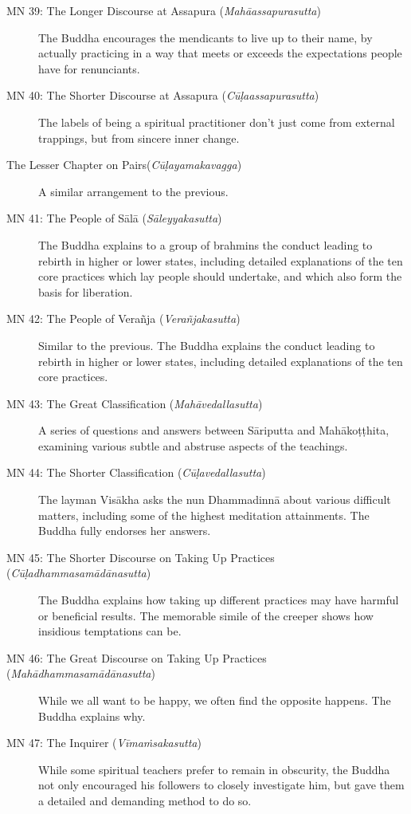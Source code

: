 \documentclass[12pt,openany]{book}%
\begin{document}
\begin{description}
\item[MN 39: The Longer Discourse at Assapura (\textit{\textsanskrit{Mahāassapurasutta}})] The Buddha encourages the mendicants to live up to their name, by actually practicing in a way that meets or exceeds the expectations people have for renunciants.%
\item[MN 40: The Shorter Discourse at Assapura (\textit{\textsanskrit{Cūḷaassapurasutta}})] The labels of being a spiritual practitioner don’t just come from external trappings, but from sincere inner change.%
\item[The Lesser Chapter on Pairs(\textit{\textsanskrit{Cūḷayamakavagga}})] A similar arrangement to the previous.%
\item[MN 41: The People of \textsanskrit{Sālā} (\textit{\textsanskrit{Sāleyyakasutta}})] The Buddha explains to a group of brahmins the conduct leading to rebirth in higher or lower states, including detailed explanations of the ten core practices which lay people should undertake, and which also form the basis for liberation.%
\item[MN 42: The People of \textsanskrit{Verañja} (\textit{\textsanskrit{Verañjakasutta}})] Similar to the previous. The Buddha explains the conduct leading to rebirth in higher or lower states, including detailed explanations of the ten core practices.%
\item[MN 43: The Great Classification (\textit{\textsanskrit{Mahāvedallasutta}})] A series of questions and answers between \textsanskrit{Sāriputta} and \textsanskrit{Mahākoṭṭhita}, examining various subtle and abstruse aspects of the teachings.%
\item[MN 44: The Shorter Classification (\textit{\textsanskrit{Cūḷavedallasutta}})] The layman \textsanskrit{Visākha} asks the nun \textsanskrit{Dhammadinnā} about various difficult matters, including some of the highest meditation attainments. The Buddha fully endorses her answers.%
\item[MN 45: The Shorter Discourse on Taking Up Practices (\textit{\textsanskrit{Cūḷadhammasamādānasutta}})] The Buddha explains how taking up different practices may have harmful or beneficial results. The memorable simile of the creeper shows how insidious temptations can be.%
\item[MN 46: The Great Discourse on Taking Up Practices (\textit{\textsanskrit{Mahādhammasamādānasutta}})] While we all want to be happy, we often find the opposite happens. The Buddha explains why.%
\item[MN 47: The Inquirer (\textit{\textsanskrit{Vīmaṁsakasutta}})] While some spiritual teachers prefer to remain in obscurity, the Buddha not only encouraged his followers to closely investigate him, but gave them a detailed and demanding method to do so.%

\end{description}
\end{document}
